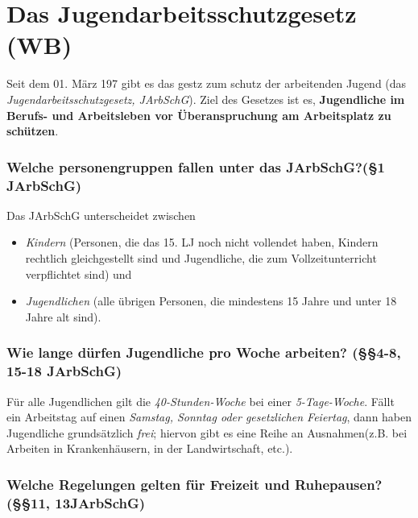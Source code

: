 \documentclass[a4paper, 12pt]{report}
\begin{document}
\section{Das Jugendarbeitsschutzgesetz (WB)}

Seit dem 01. März 197 gibt es das gestz zum schutz der arbeitenden Jugend (das 
\emph{Jugendarbeitsschutzgesetz, JArbSchG}). Ziel des Gesetzes ist es, 
\textbf{Jugendliche im Berufs- und Arbeitsleben vor Überanspruchung am 
Arbeitsplatz zu schützen}. \\

\subsubsection{Welche personengruppen fallen unter das JArbSchG?(\S 1 JArbSchG)}
Das JArbSchG unterscheidet zwischen
\begin{itemize}
    \item \emph{Kindern} (Personen, die das 15. LJ noch nicht vollendet haben, 
        Kindern rechtlich gleichgestellt sind und Jugendliche, die zum 
        Vollzeitunterricht verpflichtet sind) und 
    \item \emph{Jugendlichen} (alle übrigen Personen, die mindestens 15 Jahre 
        und unter 18 Jahre alt sind).
\end{itemize}

\subsubsection{Wie lange dürfen Jugendliche pro Woche arbeiten? 
(\S\S 4-8, 15-18 JArbSchG)}

Für alle Jugendlichen gilt die \emph{40-Stunden-Woche} bei einer 
\emph{5-Tage-Woche}. Fällt ein Arbeitstag auf einen \emph{Samstag, Sonntag oder 
gesetzlichen Feiertag}, dann haben Jugendliche grundsätzlich \emph{frei}; 
hiervon gibt es eine Reihe an Ausnahmen(z.B. bei Arbeiten in Krankenhäusern, in
der Landwirtschaft, etc.).

\newpage
\subsubsection{Welche Regelungen gelten für Freizeit und Ruhepausen? 
(\S\S 11, 13JArbSchG)}
\end{document}
